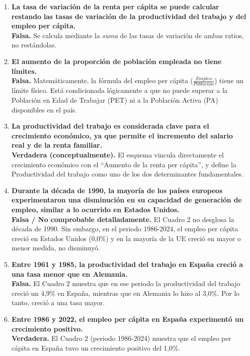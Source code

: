 \begin{enumerate}[label=\arabic*., resume=preguntas]

    \item \textbf{La tasa de variación de la renta per cápita se puede calcular restando las tasas de variación de la productividad del trabajo y del empleo per cápita.} \\
    \textbf{Falsa.} Se calcula mediante la \textit{suma} de las tasas de variación de ambas ratios, no restándolas.

    \item \textbf{El aumento de la proporción de población empleada no tiene límites.} \\
    \textbf{Falsa.} Matemáticamente, la fórmula del empleo per cápita ($\frac{Empleo}{Poblacion}$) tiene un límite físico. Está condicionada lógicamente a que no puede superar a la Población en Edad de Trabajar (PET) ni a la Población Activa (PA) disponibles en el país.

    \item \textbf{La productividad del trabajo es considerada clave para el crecimiento económico, ya que permite el incremento del salario real y de la renta familiar.} \\
    \textbf{Verdadera (conceptualmente).} El esquema vincula directamente el crecimiento económico con el ``Aumento de la renta per cápita'', y define la Productividad del trabajo como uno de los dos determinantes fundamentales.

    \item \textbf{Durante la década de 1990, la mayoría de los países europeos experimentaron una disminución en su capacidad de generación de empleo, similar a lo ocurrido en Estados Unidos.} \\
    \textbf{Falsa / No comprobable detalladamente.} El Cuadro 2 no desglosa la década de 1990. Sin embargo, en el periodo 1986-2024, el empleo per cápita creció en Estados Unidos (0,0\%) y en la mayoría de la UE creció en mayor o menor medida, no disminuyó.

    \item \textbf{Entre 1961 y 1985, la productividad del trabajo en España creció a una tasa menor que en Alemania.} \\
    \textbf{Falsa.} El Cuadro 2 muestra que en ese periodo la productividad del trabajo creció un 4,9\% en España, mientras que en Alemania lo hizo al 3,0\%. Por lo tanto, creció a una tasa mayor.

    \item \textbf{Entre 1986 y 2022, el empleo per cápita en España experimentó un crecimiento positivo.} \\
    \textbf{Verdadera.} El Cuadro 2 (periodo 1986-2024) muestra que el empleo per cápita en España tuvo un crecimiento positivo del 1,0\%.


\end{enumerate}
